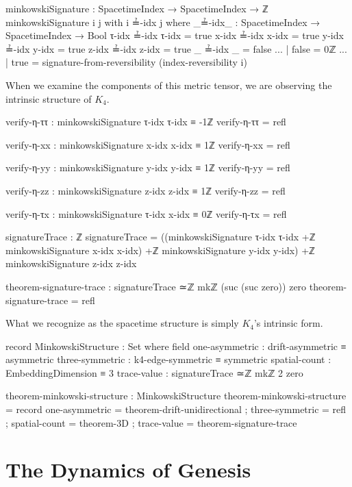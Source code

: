 \documentclass[11pt,a4paper]{book}
\begin{document}
\begin{code}
minkowskiSignature : SpacetimeIndex → SpacetimeIndex → ℤ
minkowskiSignature i j with i ≟-idx j
  where
    _≟-idx_ : SpacetimeIndex → SpacetimeIndex → Bool
    τ-idx ≟-idx τ-idx = true
    x-idx ≟-idx x-idx = true
    y-idx ≟-idx y-idx = true
    z-idx ≟-idx z-idx = true
    _     ≟-idx _     = false
... | false = 0ℤ
... | true  = signature-from-reversibility (index-reversibility i)
\end{code}

When we examine the components of this metric tensor, we are observing the intrinsic structure of $K_4$.

\begin{code}
verify-η-ττ : minkowskiSignature τ-idx τ-idx ≡ -1ℤ
verify-η-ττ = refl

verify-η-xx : minkowskiSignature x-idx x-idx ≡ 1ℤ
verify-η-xx = refl

verify-η-yy : minkowskiSignature y-idx y-idx ≡ 1ℤ
verify-η-yy = refl

verify-η-zz : minkowskiSignature z-idx z-idx ≡ 1ℤ
verify-η-zz = refl

verify-η-τx : minkowskiSignature τ-idx x-idx ≡ 0ℤ
verify-η-τx = refl

signatureTrace : ℤ
signatureTrace = ((minkowskiSignature τ-idx τ-idx +ℤ 
                   minkowskiSignature x-idx x-idx) +ℤ
                   minkowskiSignature y-idx y-idx) +ℤ
                   minkowskiSignature z-idx z-idx

theorem-signature-trace : signatureTrace ≃ℤ mkℤ (suc (suc zero)) zero
theorem-signature-trace = refl
\end{code}

What we recognize as the spacetime structure is simply $K_4$'s intrinsic form.

\begin{code}
record MinkowskiStructure : Set where
  field
    one-asymmetric   : drift-asymmetric ≡ asymmetric
    three-symmetric  : k4-edge-symmetric ≡ symmetric
    spatial-count    : EmbeddingDimension ≡ 3
    trace-value      : signatureTrace ≃ℤ mkℤ 2 zero

theorem-minkowski-structure : MinkowskiStructure
theorem-minkowski-structure = record
  { one-asymmetric = theorem-drift-unidirectional
  ; three-symmetric = refl
  ; spatial-count = theorem-3D
  ; trace-value = theorem-signature-trace
  }
\end{code}

\section{The Dynamics of Genesis}
\end{document}
